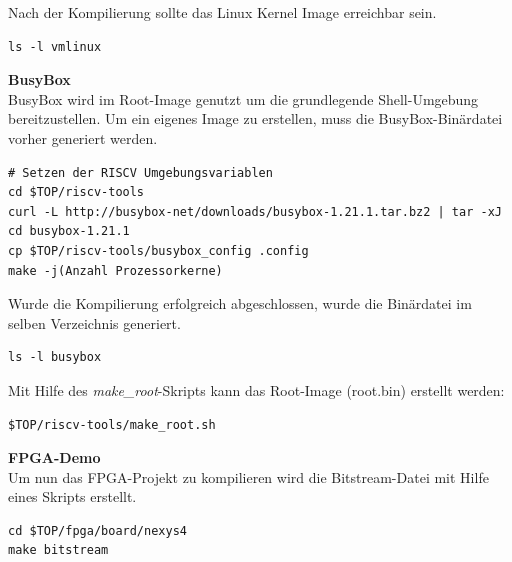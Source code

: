 \vspace{10mm}

Nach der Kompilierung sollte das Linux Kernel Image erreichbar sein.\\

\begin{lstlisting}[caption={Erreichbarkeit des Kernel-Images},label={code:kernelimage}]
ls -l vmlinux
\end{lstlisting}

\newpage
\textbf{BusyBox}\\

BusyBox wird im Root-Image genutzt um die grundlegende Shell-Umgebung bereitzustellen. Um ein eigenes Image zu erstellen, muss die BusyBox-Binärdatei vorher generiert werden.\\

\begin{lstlisting}[caption={Download der BusyBox},label={code:dowbusybox},extendedchars=false]
# Setzen der RISCV Umgebungsvariablen
cd $TOP/riscv-tools
curl -L http://busybox-net/downloads/busybox-1.21.1.tar.bz2 | tar -xJ
cd busybox-1.21.1
cp $TOP/riscv-tools/busybox_config .config
make -j(Anzahl Prozessorkerne)
\end{lstlisting}


Wurde die Kompilierung erfolgreich abgeschlossen, wurde die Binärdatei im selben Verzeichnis generiert.\\

\begin{lstlisting}[caption={BusyBox},label={code:busybox}]
ls -l busybox
\end{lstlisting}

Mit Hilfe des \emph{make\_root}-Skripts kann das Root-Image (root.bin) erstellt werden:\\


\begin{lstlisting}[caption={Generieren des Root-Image},label={code:rootimage}]
$TOP/riscv-tools/make_root.sh
\end{lstlisting}

\textbf{FPGA-Demo}\\

Um nun das FPGA-Projekt zu kompilieren wird die Bitstream-Datei mit Hilfe eines Skripts erstellt.\\

\begin{lstlisting}[caption={Erzeugen des Bitfiles},label={code:bitfile}]
cd $TOP/fpga/board/nexys4
make bitstream
\end{lstlisting}


